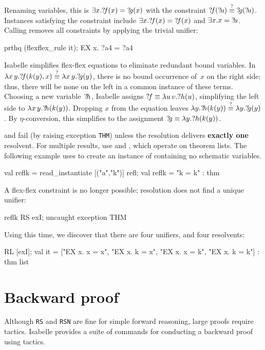 \noindent
Renaming variables, this is $\exists x.{?\!f}(x)={?\!g}(x)$ with
the constraint ${{?\!f}({?\!u})\stackrel{?}{\equiv}{?\!g}({?\!u})}$.  Instances
satisfying the constraint include $\exists x.{?\!f}(x)={?\!f}(x)$ and
$\exists x.x={?\!u}$.  Calling  removes all
constraints by applying the trivial unifier:
\begin{ttbox} 
prthq (flexflex_rule it);
{\out EX x. ?a4 = ?a4}
\end{ttbox} 
Isabelle simplifies flex-flex equations to eliminate redundant bound
variables.  In $\lambda x\,y.{?\!f}(k(y),x) \stackrel{?}{\equiv} \lambda x\,y.{?\!g}(y)$,
there is no bound occurrence of~$x$ on the right side; thus, there will be
none on the left in a common instance of these terms.  Choosing a new
variable~${?\!h}$, Isabelle assigns ${?\!f}\equiv \lambda u\,v.?h(u)$,
simplifying the left side to $\lambda x\,y.{?\!h}(k(y))$.  Dropping $x$
from the equation leaves $\lambda y.{?\!h}(k(y)) \stackrel{?}{\equiv} \lambda
y.{?\!g}(y)$.  By $\eta$-conversion, this simplifies to the assignment
${?\!g}\equiv\lambda y.?h(k(y))$.

\begin{warn}
 and  fail (by raising exception {\tt THM}) unless
the resolution delivers {\bf exactly one} resolvent.  For multiple results,
use  and , which operate on theorem lists.  The
following example uses  to create an instance
of  containing no schematic variables.
\begin{ttbox} 
val reflk = read_instantiate [("a","k")] refl;
{\out val reflk = "k = k" : thm}
\end{ttbox}

\noindent
A flex-flex constraint is no longer possible; resolution does not find a
unique unifier:
\begin{ttbox} 
reflk RS exI;
{\out uncaught exception THM}
\end{ttbox}
Using  this time, we discover that there are four unifiers, and
four resolvents:
\begin{ttbox} 
[reflk] RL [exI];
{\out val it = ["EX x. x = x", "EX x. k = x",}
{\out           "EX x. x = k", "EX x. k = k"] : thm list}
\end{ttbox} 
\end{warn}


\section{Backward proof}
Although {\tt RS} and {\tt RSN} are fine for simple forward reasoning,
large proofs require tactics.  Isabelle provides a suite of commands for
conducting a backward proof using tactics.

